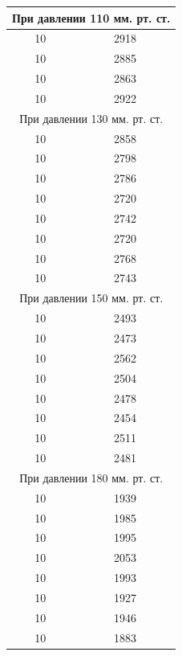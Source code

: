 \documentclass[a4paper,14pt]{extarticle}
\begin{document}
\begin{table}[h!]
\begin{tabular}{|c|c|}
			
	\end{tabular}
	\begin{tabular}{|c|c|}
		\hline	


		\multicolumn{2}{|c|}{При давлении 110 мм. рт. ст.}\\ \hline
		10	&	2918	\\ \hline
		10	&	2885	\\ \hline
		10	&	2863	\\ \hline
		10	&	2922	\\ \hline
		\multicolumn{2}{|c|}{При давлении 130 мм. рт. ст.}\\ \hline
		10	&	2858	\\ \hline
		10	&	2798	\\ \hline
		10	&	2786	\\ \hline
		10	&	2720	\\ \hline
		10	&	2742	\\ \hline
		10	&	2720	\\ \hline
		10	&	2768	\\ \hline
		10	&	2743	\\ \hline
		\multicolumn{2}{|c|}{При давлении 150 мм. рт. ст.}\\ \hline
		10	&	2493	\\ \hline
		10	&	2473	\\ \hline
		10	&	2562	\\ \hline
		10	&	2504	\\ \hline
		10	&	2478	\\ \hline
		10	&	2454	\\ \hline
		10	&	2511	\\ \hline
		10	&	2481	\\ \hline
		\multicolumn{2}{|c|}{При давлении 180 мм. рт. ст.}\\ \hline
		10	&	1939	\\ \hline
		10	&	1985	\\ \hline
		10	&	1995	\\ \hline
		10	&	2053	\\ \hline
		10	&	1993	\\ \hline
		10	&	1927	\\ \hline
		10	&	1946	\\ \hline
		10	&	1883	\\ \hline
		
		\end{tabular}
	\end{table}
\end{document}
